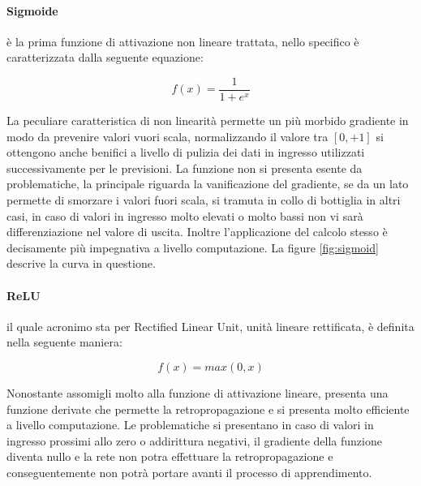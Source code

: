 \documentclass[%
    corpo=12pt,
    twoside,
    oldstyle,
    autoretitolo,
    greek,
    evenboxes,
]{toptesi}
\begin{document}
\paragraph{Sigmoide} è la prima funzione di attivazione non lineare trattata, nello specifico è caratterizzata dalla seguente equazione:
\begin{center}
  \begin{equation}
    f(x) = \frac{1}{1+e^{x}}
  \end{equation}
\end{center}
La peculiare caratteristica di non linearità permette un più morbido gradiente in modo da prevenire valori vuori scala, normalizzando il valore tra $[0, +1]$ si ottengono anche benifici a livello di pulizia dei dati in ingresso utilizzati successivamente per le previsioni. La funzione non si presenta esente da problematiche, la principale riguarda la vanificazione del gradiente, se da un lato permette di smorzare i valori fuori scala, si tramuta in collo di bottiglia in altri casi, in caso di valori in ingresso molto elevati o molto bassi non vi sarà differenziazione nel valore di uscita. Inoltre l'applicazione del calcolo stesso è decisamente più impegnativa a livello computazione. La figure \ref{fig:sigmoid} descrive la curva in questione.

\paragraph{ReLU} il quale acronimo sta per Rectified Linear Unit, unità lineare rettificata, è definita nella seguente maniera:
\begin{center}
  \begin{equation}
    f(x)= max(0, x)
  \end{equation}
\end{center}
Nonostante assomigli molto alla funzione di attivazione lineare, presenta una funzione derivate che permette la retropropagazione e si presenta molto efficiente a livello computazione. Le problematiche si presentano in caso di valori in ingresso prossimi allo zero o addirittura negativi, il gradiente della funzione diventa nullo e la rete non potra effettuare la retropropagazione e conseguentemente non potrà portare avanti il processo di apprendimento.
\end{document}
